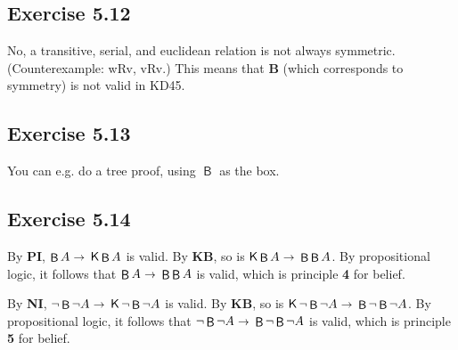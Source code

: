 \documentclass{scrartcl}
\let\oldto\to
\renewcommand\to{\scaleobj{0.95}{\,\oldto\,}}
\DeclareMathOperator{\Kn}{\mathsf{K}{}}
\DeclareMathOperator{\Bel}{\mathsf{B}}
\begin{document}
  \subsection*{Exercise 5.12}

%
%
  No, a transitive, serial, and euclidean relation is not always
  symmetric. (Counterexample: wRv, vRv.) This means that \textbf{B} (which
  corresponds to symmetry) is not valid in KD45.


  \subsection*{Exercise 5.13}

%
%
  You can e.g. do a tree proof, using $\Bel$ as the box.

  \subsection*{Exercise 5.14}

%
%
  By \textbf{PI}, $\Bel A \to \Kn\Bel A$ is valid. By \textbf{KB}, so
  is $\Kn\Bel A \to \Bel\Bel A$. By propositional logic, it follows
  that $\Bel A \to \Bel\Bel A$ is valid, which is principle \textbf{4}
  for belief.

  By \textbf{NI}, $\neg \Bel \neg A \to \Kn\neg \Bel \neg A$ is valid. By \textbf{KB}, so
  is $\Kn\neg \Bel \neg A \to \Bel\neg \Bel \neg A$. By propositional logic, it follows
  that $\neg \Bel \neg A \to \Bel\neg \Bel \neg A$ is valid, which is principle \textbf{5}
  for belief.
\end{document}
